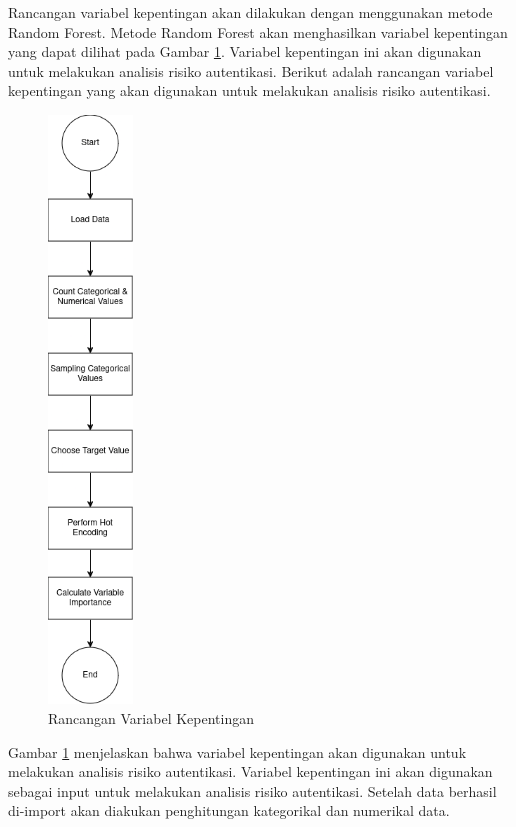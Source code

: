Rancangan variabel kepentingan akan dilakukan dengan menggunakan metode Random Forest. Metode Random Forest akan menghasilkan variabel kepentingan yang dapat dilihat pada Gambar \ref{fig:variabel-kepentingan}. Variabel kepentingan ini akan digunakan untuk melakukan analisis risiko autentikasi.
Berikut adalah rancangan variabel kepentingan yang akan digunakan untuk melakukan analisis risiko autentikasi.
\begin{figure}[H]
    \centering
    \includegraphics[width=0.2\textwidth]{BAB_TESIS/IMAGES/vim_1.drawio.png}
    \caption{Rancangan Variabel Kepentingan}
    \label{fig:variabel-kepentingan}
\end{figure}

Gambar \ref{fig:variabel-kepentingan} menjelaskan bahwa variabel kepentingan akan digunakan untuk melakukan analisis risiko autentikasi. Variabel kepentingan ini akan digunakan sebagai input untuk melakukan analisis risiko autentikasi.
Setelah data berhasil di-import akan diakukan penghitungan kategorikal dan numerikal data. 